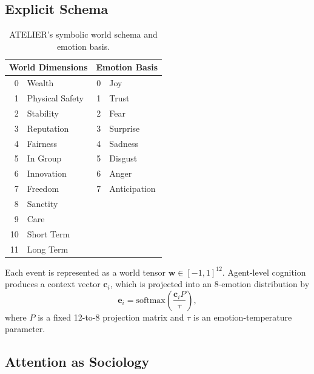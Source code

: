 \documentclass[12pt]{IEEEtran}
\begin{document}
\subsection{Explicit Schema}

\begin{table}[H]
\caption{ATELIER's symbolic world schema and emotion basis.}
\label{tab:schema}
\centering
\begin{tabular}{@{}rlrl@{}}
\toprule
\multicolumn{2}{c}{\textbf{World Dimensions}} & \multicolumn{2}{c}{\textbf{Emotion Basis}} \\
\midrule
0 & Wealth & 0 & Joy \\
1 & Physical Safety & 1 & Trust \\
2 & Stability & 2 & Fear \\
3 & Reputation & 3 & Surprise \\
4 & Fairness & 4 & Sadness \\
5 & In Group & 5 & Disgust \\
6 & Innovation & 6 & Anger \\
7 & Freedom & 7 & Anticipation \\
8 & Sanctity &  &  \\
9 & Care &  &  \\
10 & Short Term &  &  \\
11 & Long Term &  &  \\
\bottomrule
\end{tabular}
\end{table}

Each event is represented as a world tensor $\mathbf{w}\in[-1,1]^{12}$. Agent-level cognition produces a context vector $\mathbf{c}_i$, which is projected into an 8-emotion distribution by
\begin{equation}
\mathbf{e}_i = \text{softmax}\left(\frac{\mathbf{c}_i P}{\tau}\right),
\end{equation}
where $P$ is a fixed 12-to-8 projection matrix and $\tau$ is an emotion-temperature parameter.

\subsection{Attention as Sociology}
\end{document}
